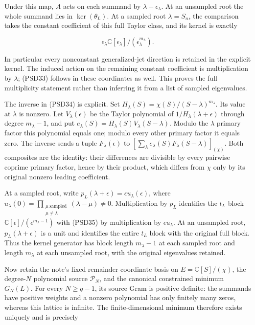 Under this map, \(A\) acts on each summand by \(\lambda+\epsilon_\lambda\). At an unsampled root the whole summand lies in \(\ker(\theta_L)\). At a sampled root \(\lambda=S_n\), the comparison takes the constant coefficient of this full Taylor class, and its kernel is exactly

\[
\epsilon_\lambda\mathbb{C}[\epsilon_\lambda]/(\epsilon_\lambda^{m_\lambda}).
\tag{PSD35}
\]

In particular every nonconstant generalized-jet direction is retained in the explicit kernel. The induced action on the remaining constant coefficient is multiplication by \(\lambda\); (PSD33) follows in these coordinates as well. This proves the full multiplicity statement rather than inferring it from a list of sampled eigenvalues.

The inverse in (PSD34) is explicit. Set \(H_\lambda(S)=\chi(S)/(S-\lambda)^{m_\lambda}\). Its value at \(\lambda\) is nonzero. Let \(V_\lambda(\epsilon)\) be the Taylor polynomial of \(1/H_\lambda(\lambda+\epsilon)\) through degree \(m_\lambda-1\), and put \(e_\lambda(S)=H_\lambda(S)V_\lambda(S-\lambda)\). Modulo the \(\lambda\) primary factor this polynomial equals one; modulo every other primary factor it equals zero. The inverse sends a tuple \(F_\lambda(\epsilon)\) to \(\left[\sum_\lambda e_\lambda(S)F_\lambda(S-\lambda)\right]_{(\chi)}\). Both composites are the identity: their differences are divisible by every pairwise coprime primary factor, hence by their product, which differs from \(\chi\) only by its original nonzero leading coefficient.

At a sampled root, write \(p_L(\lambda+\epsilon)=\epsilon u_\lambda(\epsilon)\), where \(u_\lambda(0)=\prod_{\substack{\mu\ \mathrm{sampled}\\\mu\ne\lambda}}(\lambda-\mu)\ne0\). Multiplication by \(p_L\) identifies the \(t_L\) block \(\mathbb{C}[\epsilon]/(\epsilon^{m_\lambda-1})\) with (PSD35) by multiplication by \(\epsilon u_\lambda\). At an unsampled root, \(p_L(\lambda+\epsilon)\) is a unit and identifies the entire \(t_L\) block with the original full block. Thus the kernel generator has block length \(m_\lambda-1\) at each sampled root and length \(m_\lambda\) at each unsampled root, with the original eigenvalues retained.

Now retain the note's fixed remainder-coordinate basis on \(E=\mathbb{C}[S]/(\chi)\), the degree-\(N\) polynomial source \(\mathcal P_N\), and the canonical constrained minimum \(G_N(L)\). For every \(N\ge q-1\), its source Gram is positive definite: the summands have positive weights and a nonzero polynomial has only finitely many zeros, whereas this lattice is infinite. The finite-dimensional minimum therefore exists uniquely and is precisely

